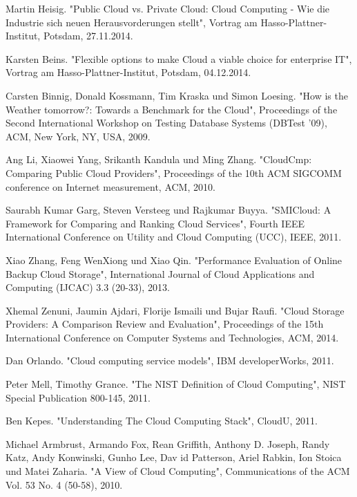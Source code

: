 \ifCLASSOPTIONcaptionsoff
  \newpage
\fi

\begin{thebibliography}{1}
  
Martin Heisig. "Public Cloud vs. Private Cloud: Cloud Computing - Wie die Industrie sich neuen Herausvorderungen stellt", Vortrag am Hasso-Plattner-Institut, Potsdam, 27.11.2014.

Karsten Beins. "Flexible options to make Cloud a viable choice for enterprise IT", Vortrag am Hasso-Plattner-Institut, Potsdam, 04.12.2014.

Carsten Binnig, Donald Kossmann, Tim Kraska und Simon Loesing. "How is the Weather tomorrow?: Towards a Benchmark for the Cloud", Proceedings of the Second International Workshop on Testing Database Systems (DBTest '09), ACM, New York, NY, USA, 2009.

Ang Li, Xiaowei Yang, Srikanth Kandula und Ming Zhang. "CloudCmp: Comparing Public Cloud Providers", Proceedings of the 10th ACM SIGCOMM conference on Internet measurement, ACM, 2010.

Saurabh Kumar Garg, Steven Versteeg und Rajkumar Buyya. "SMICloud: A Framework for Comparing and Ranking Cloud Services", Fourth IEEE International Conference on Utility and Cloud Computing (UCC), IEEE, 2011.

Xiao Zhang, Feng WenXiong und Xiao Qin. "Performance Evaluation of Online Backup Cloud Storage", International Journal of Cloud Applications and Computing (IJCAC) 3.3 (20-33), 2013.

Xhemal Zenuni, Jaumin Ajdari, Florije Ismaili und Bujar Raufi. "Cloud Storage Providers: A Comparison Review and Evaluation", Proceedings of the 15th International Conference on Computer Systems and Technologies, ACM, 2014.

Dan Orlando. "Cloud computing service models", IBM developerWorks, 2011.

Peter Mell, Timothy Grance. "The NIST Definition of Cloud Computing", NIST Special Publication 800-145, 2011.

Ben Kepes. "Understanding The Cloud Computing Stack", CloudU, 2011.

Michael Armbrust, Armando Fox, Rean Griffith, Anthony D. Joseph, Randy Katz, Andy Konwinski, Gunho Lee, Dav id Patterson, Ariel Rabkin, Ion Stoica und Matei Zaharia. "A View of Cloud Computing", Communications of the ACM Vol. 53 No. 4 (50-58), 2010.


\end{thebibliography}
